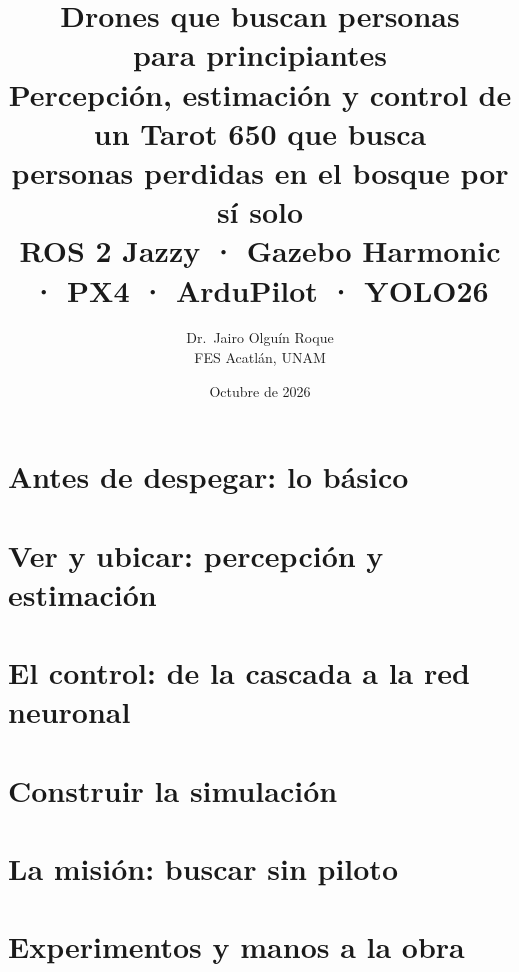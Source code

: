 \documentclass[11pt,letterpaper,oneside,openany]{book}
\title{\textbf{Drones que buscan personas}\\[4pt]
\textbf{para principiantes}\\[10pt]
\Large Percepción, estimación y control de un Tarot 650 que busca\\ personas perdidas en el bosque por sí solo\\[8pt]
\large ROS 2 Jazzy · Gazebo Harmonic · PX4 · ArduPilot · YOLO26}
\author{Dr.\ Jairo Olguín Roque\\
FES Acatlán, UNAM}
\date{Octubre de 2026}
\begin{document}
\frontmatter
\maketitle
\tableofcontents


\mainmatter
\part{Antes de despegar: lo básico}






\part{Ver y ubicar: percepción y estimación}





\part{El control: de la cascada a la red neuronal}



\part{Construir la simulación}





\part{La misión: buscar sin piloto}




\part{Experimentos y manos a la obra}





\appendix

\end{document}

